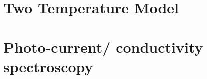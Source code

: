 \documentclass[]{book}
\begin{document}
\chapter{Two Temperature Model}


\chapter{Photo-current/ conductivity spectroscopy}

\end{document}
